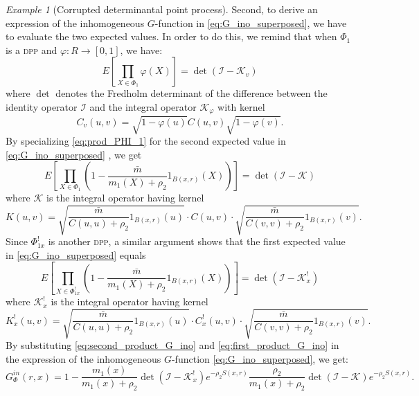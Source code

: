 \documentclass[11pt,a4paper,oneside]{article}
\newcommand{\indicator}{\ensuremath{{1}}}
\newcommand{\E}{E}
\theoremstyle{definition}
\theoremstyle{remark}
\newtheorem{example}{Example}
\begin{document}
\begin{example}[Corrupted determinantal point process]
Second, to derive an expression of the inhomogeneous $G$-function in \eqref{eq:G_ino_superposed}, we have to evaluate the two expected values. In order to do this, we remind that when $\Phi_1$ is a \textsc{dpp} and $\varphi : R \to [0,1]$, we have:
\begin{equation} \label{eq:prod_PHI_1}
    \E \left[ \prod_{X \in \Phi_1} \varphi (X)\right] = \det \left(  \mathcal{I} - \mathcal{K}_v \right) 
\end{equation}
where $\det$ denotes the Fredholm determinant of the difference between the identity operator $\mathcal{I}$ and the integral operator $\mathcal{K}_\varphi$ with kernel 
\[
C_v (u,v) = \sqrt{1-\varphi (u)} C (u,v) \sqrt{1- \varphi (v)}.
\]
By specializing \eqref{eq:prod_PHI_1} for the second expected value in \eqref{eq:G_ino_superposed}
, we get
\begin{equation}
    \label{eq:second_product_G_ino}
   \E \left[  \prod_{X \in \Phi_1} \left(1- \frac{\bar m}{m_1 (X)+ \rho_2} \indicator_{B (x, r)}(X)  \right)\right]  =
   \det \left( \mathcal{I} - \mathcal{K} \right)
\end{equation}
where $\mathcal{K}$ is the integral operator having kernel
\[
K (u,v) = \sqrt{\frac{\bar m}{C (u,u)+ \rho_2} \indicator_{B (x,r)} (u)} \cdot  C (u,v) \cdot
\sqrt{\frac{\bar m}{C (v,v)+ \rho_2} \indicator_{B (x,r)} (v)}.
\]
Since $\Phi_{1x}^!$ is another \textsc{dpp}, a similar argument shows that the first expected value in \eqref{eq:G_ino_superposed} equals
\begin{equation}
    \label{eq:first_product_G_ino}
   \E \left[  \prod_{X \in \Phi_{1x}^!} \left(1- \frac{\bar m}{m_1 (X)+ \rho_2} \indicator_{B (x, r)}(X)  \right)\right]  =
   \det \left( \mathcal{I} - \mathcal{K}_{x}^! \right)
\end{equation}
where $\mathcal{K}_{x}^!$ is the integral operator having kernel
\[
K_{x}^! (u,v) = \sqrt{\frac{\bar m}{C (u,u)+ \rho_2} \indicator_{B (x,r)} (u)} \cdot  C^{!}_x (u,v) \cdot
\sqrt{\frac{\bar m}{C (v,v)+ \rho_2} \indicator_{B (x,r)} (v)}.
\]
By substituting \eqref{eq:second_product_G_ino} and \eqref{eq:first_product_G_ino} in the expression  of the 
inhomogeneous $G$-function \eqref{eq:G_ino_superposed}, we get:
    \begin{equation*}
             G^{in}_{\Phi}(r,x)   = 1- \frac{m_1 (x)}{m_1 (x) + \rho_2}   \det \left( \mathcal{I} - \mathcal{K}_{x}^! \right)e^{- \rho_2 S (x, r)}
          \frac{\rho_2}{m_1 (x) + \rho_2}  \det \left( \mathcal{I} - \mathcal{K} \right) e^{- \rho_2 S (x, r)}.
    \end{equation*}

\end{example}
\end{document}
